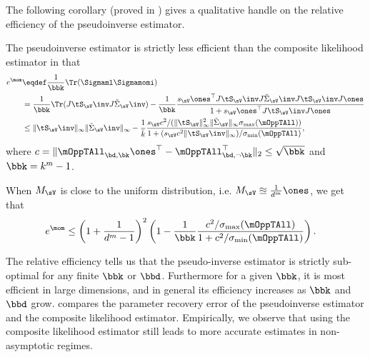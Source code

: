 The following corollary (proved in ) gives
a qualitative handle on the relative efficiency of the pseudoinverse
estimator.
\begin{corollary}
  \label{cor:efficiency}
The pseudoinverse estimator is strictly less efficient
than the composite likelihood estimator in that 
\begin{align*}
e^\mom &\eqdef 
    \frac{1}{\bbk} \Tr(\Sigmaml\Sigmamomi ) \\
        &= \frac{1}{\bbk} \Tr( J \tS_\sV\inv J \tilde\Sigma_\sV\inv ) - \frac{1}{\bbk} \frac{s_\sV \ones^\top J \tS_\sV\inv J \tilde\Sigma_\sV\inv J \tS_\sV\inv J \ones }
      {1 + s_\sV \ones^\top J \tS_\sV\inv J \ones} \\
    &\le \|\tS_\sV\inv\|_\infty  \|\tilde\Sigma_\sV\inv\|_\infty
      - 
        \frac{1}{\bar k} 
    \frac{
        s_\sV c^2 /(\|\tS_\sV\|^2_{\infty} \|\tilde\Sigma_\sV\|_{\infty}
            \sigma_{\max}(\mOppTAll))
    }
    {1 + (s_\sV c^2 \|\tS_\sV\inv\|_{\infty})/
          \sigma_{\min}(\mOppTAll)
    },
\end{align*}
where $c = \|\mOppTAll_{\bd,\bk} \ones^\top - \mOppTAll_{\bd,\neg \bk}^\top\|_2 \le \sqrt{\bbk}$ and $\bbk = k^m - 1$.

When $M_\sV$ is close to the uniform distribution, i.e. $M_\sV \approxeq \frac{1}{d^m} \ones$, we get that 
\begin{align*}
e^\mom 
    &\le
    \left(1 + \frac{1}{d^m - 1}\right)^2 
    \left(1 - \frac{1}{\bbk} \frac{c^2/\sigma_{\max}(\mOppTAll)}{1 + c^2 / \sigma_{\min}(\mOppTAll)}\right).
\end{align*}
\end{corollary}

The relative efficiency tells us that the pseudo-inverse estimator is
strictly sub-optimal for any finite $\bbk$ or $\bbd$. Furthermore for
a given $\bbk$, it is most efficient in large dimensions, and in general
its efficiency increases as $\bbk$ and $\bbd$ grow.
 compares the parameter recovery error of the
  pseudoinverse estimator and the composite likelihood estimator.
Empirically, we observe that using the composite likelihood estimator
still leads to more accurate estimates in non-asymptotic regimes.


